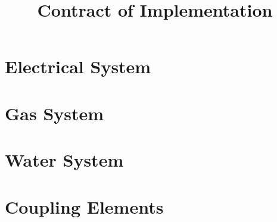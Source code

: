 \documentclass{article}
\title{Contract of Implementation}
\begin{document}
\maketitle







\section{Electrical System}





\section{Gas System}





\section{Water System}





\section{Coupling Elements}



\newpage
\printglossaries
\end{document}

